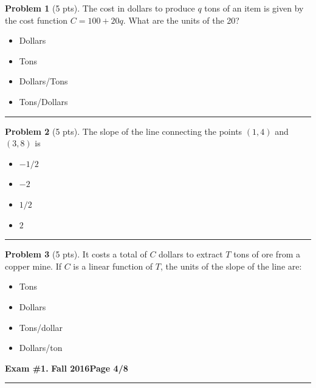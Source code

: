 \documentclass[12pt]{article}
\makeatletter
\theoremstyle{definition}
\newtheorem{problem}{Problem}
\newcommand*{\radiobutton}{%
  \@ifstar{\@radiobutton0}{\@radiobutton1}%
}
\newcommand*{\@radiobutton}[1]{%
  \begin{tikzpicture}
    \pgfmathsetlengthmacro\radius{height("X")/2}
    \draw[radius=\radius] circle;
    \ifcase#1 \fill[radius=.6*\radius] circle;\fi
  \end{tikzpicture}%
}
\makeatother
\begin{document}
\begin{problem}[5 pts]
The cost in dollars to produce $q$ tons of an item is given by the cost function $C = 100 + 20q$. What are the units of the 20?
\begin{itemize}
\item[\radiobutton] Dollars
\item[\radiobutton] Tons
\item[\radiobutton] Dollars/Tons
\item[\radiobutton] Tons/Dollars
\end{itemize} 
\end{problem}
\hrule

\begin{problem}[5 pts]
The slope of the line connecting the points $(1, 4)$ and $(3, 8)$ is
\begin{itemize}
\item[\radiobutton] $-1/2$
\item[\radiobutton] $-2$
\item[\radiobutton] $1/2$
\item[\radiobutton] $2$
\end{itemize}
\end{problem}
\hrule

\begin{problem}[5 pts]
It costs a total of $C$ dollars to extract $T$ tons of ore from a copper mine. If $C$ is a linear function of $T$, the units of the slope of the line are:
\begin{itemize}
\item[\radiobutton] Tons
\item[\radiobutton] Dollars
\item[\radiobutton] Tons/dollar
\item[\radiobutton] Dollars/ton
\end{itemize}
\end{problem}

\newpage

\hfill{\large\bf Exam \#1.}\hfill{\large\bf
  Fall 2016}\hfill{\large\bf Page 4/8}\hrule
\end{document}
